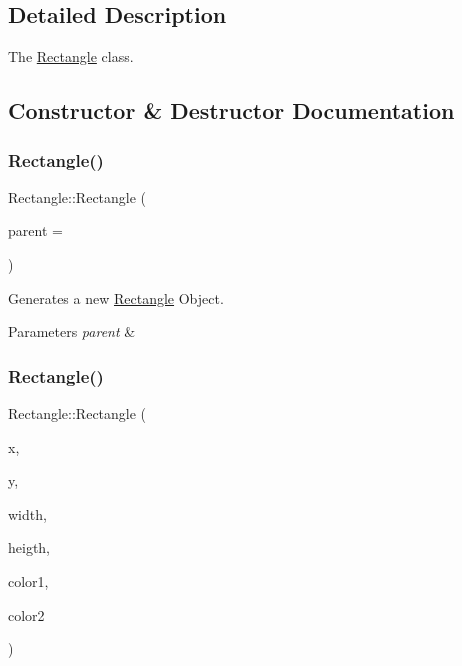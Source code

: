 \subsection{Detailed Description}
The \hyperlink{class_rectangle}{Rectangle} class. 

\subsection{Constructor \& Destructor Documentation}
\mbox{\label{class_rectangle_af7b47bc1819c9c74311686ec33e6b921}} 
\subsubsection{\texorpdfstring{Rectangle()}{Rectangle()}\hspace{0.1cm}{\footnotesize\ttfamily [1/2]}}
{\footnotesize\ttfamily Rectangle\+::\+Rectangle (\begin{DoxyParamCaption}\item[{Q\+Object $\ast$}]{parent = {} }\end{DoxyParamCaption})\hspace{0.3cm}{\ttfamily [explicit]}}



Generates a new \hyperlink{class_rectangle}{Rectangle} Object. 


\begin{DoxyParams}{Parameters}
{\em parent} & \\
\hline
\end{DoxyParams}
\mbox{\label{class_rectangle_a5338f8ff5aa04be36032562617fe0603}} 
\subsubsection{\texorpdfstring{Rectangle()}{Rectangle()}\hspace{0.1cm}{\footnotesize\ttfamily [2/2]}}
{\footnotesize\ttfamily Rectangle\+::\+Rectangle (\begin{DoxyParamCaption}\item[{qreal}]{x,  }\item[{qreal}]{y,  }\item[{qreal}]{width,  }\item[{qreal}]{heigth,  }\item[{Q\+Color}]{color1,  }\item[{Q\+Color}]{color2 }\end{DoxyParamCaption})}



